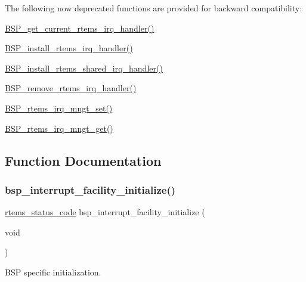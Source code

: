 The following now deprecated functions are provided for backward compatibility\+:
\begin{DoxyItemize}
\item \mbox{\hyperlink{irq-legacy_8c_a58a7375c32f3af8b27a7c6f8affa68dd}{B\+S\+P\+\_\+get\+\_\+current\+\_\+rtems\+\_\+irq\+\_\+handler()}}
\item \mbox{\hyperlink{irq-legacy_8c_aafe4bbaa5e7fb14cfe9da0a0eeab677f}{B\+S\+P\+\_\+install\+\_\+rtems\+\_\+irq\+\_\+handler()}}
\item \mbox{\hyperlink{irq-legacy_8c_acab7c86c6044f62f97cf47be2599c121}{B\+S\+P\+\_\+install\+\_\+rtems\+\_\+shared\+\_\+irq\+\_\+handler()}}
\item \mbox{\hyperlink{irq-legacy_8c_ad2275e290ae086c1b8a78168da08f0ee}{B\+S\+P\+\_\+remove\+\_\+rtems\+\_\+irq\+\_\+handler()}}
\item \mbox{\hyperlink{irq-legacy_8c_a816465eef6ad100fa2bd72f38933721b}{B\+S\+P\+\_\+rtems\+\_\+irq\+\_\+mngt\+\_\+set()}}
\item \mbox{\hyperlink{irq-legacy_8c_a6d11c2b507d8ecb701bc14317ee0074c}{B\+S\+P\+\_\+rtems\+\_\+irq\+\_\+mngt\+\_\+get()}} 
\end{DoxyItemize}

\subsection{Function Documentation}
\mbox{\label{group__bsp__interrupt_gab114a6e92b17b99bf52cf24d1125a9df}} 
\subsubsection{\texorpdfstring{bsp\_interrupt\_facility\_initialize()}{bsp\_interrupt\_facility\_initialize()}}
{\footnotesize\ttfamily \mbox{\hyperlink{group__ClassicStatus_ga545d41846817eaba6143d52ee4d9e9fe}{rtems\+\_\+status\+\_\+code}} bsp\+\_\+interrupt\+\_\+facility\+\_\+initialize (\begin{DoxyParamCaption}\item[{void}]{ }\end{DoxyParamCaption})}



B\+SP specific initialization. 


